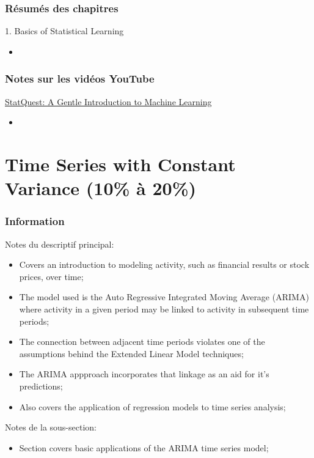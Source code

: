 \documentclass[12pt, titlepage, french]{report}
\begin{document}
\subsection{Résumés des chapitres}

\begin{CHPT_SUMM}[label = {BASICS}]{1. Basics of Statistical Learning}
	\begin{itemize}
		\item	
	\end{itemize}
\end{CHPT_SUMM}

\subsection{Notes sur les vidéos YouTube}

\begin{YTB_SUMM}[label = {SQ-BASICS-ML-INTRO}]{\href{https://www.youtube.com/watch?v=Gv9_4yMHFhI&list=PLblh5JKOoLUICTaGLRoHQDuF_7q2GfuJF&index=2&t=0s}{StatQuest: A Gentle Introduction to Machine Learning}}
\begin{itemize}
	\item	
\end{itemize}
\end{YTB_SUMM}

\newpage

\chapter[Time Series with Constant Variance]{Time Series with Constant Variance (10\% à 20\%)}

\subsection{Information}

\begin{distributions}[Description]
Notes du descriptif principal:
\begin{itemize}
	\item	Covers an introduction to modeling activity, such as financial results or stock prices, over time;
	\item	The model used is the Auto Regressive Integrated Moving Average (ARIMA) where activity in a given period may be linked to activity in subsequent time periods;
	\item	The connection between adjacent time periods violates one of the assumptions behind the Extended Linear Model techniques;
	\item	The ARIMA appproach incorporates that linkage as an aid for it's predictions;
	\item	Also covers the application of regression models to time series analysis;
\end{itemize}
\tcbline
Notes de la sous-section:
\begin{itemize}
	\item	Section covers basic applications of the ARIMA time series model;
\end{itemize}
\end{distributions}
\end{document}
